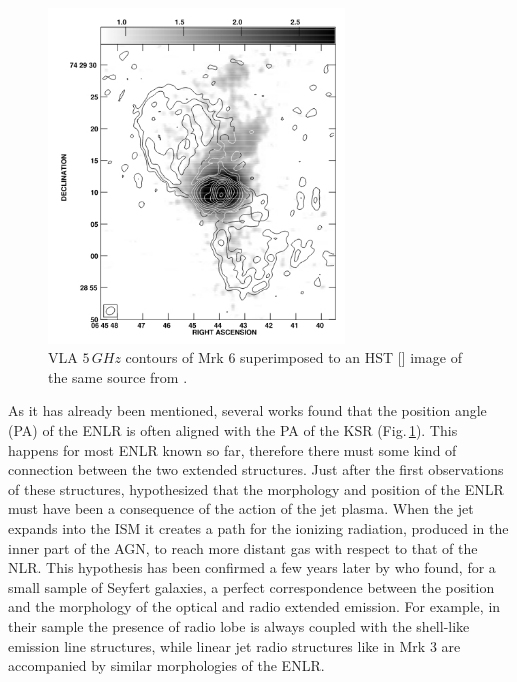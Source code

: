 \documentclass[../thesis.tex]{subfiles}
\begin{document}
\begin{figure}
\centering
\includegraphics[width=0.7\textwidth]{images/Mrk6_kharb.jpg} 
\caption[]{VLA $5\,\si{GHz}$ contours of Mrk 6 superimposed to an HST [] image of the same source from \citet{Kharb06}. }
\label{fig:mrk6_kharb}
\end{figure}

As it has already been mentioned, several works found that the position angle (PA) of the ENLR is often aligned with the PA of the KSR \citep[e.g.][]{Unger87,Wilson94,Capetti96,Falcke98,Schmitt03,Schmitt03b,Morganti07,Husemann13} (Fig.\,\ref{fig:mrk6_kharb}). 
This happens for most ENLR known so far, therefore there must some kind of connection between the two extended structures.
Just after the first observations of these structures, \citet{Wilson94} hypothesized that the morphology and position of the ENLR must have been a consequence of the action of the jet plasma.
When the jet expands into the ISM it creates a path for the ionizing radiation, produced in the inner part of the AGN, to reach more distant gas with respect to that of the NLR.
This hypothesis has been confirmed a few years later by \citet{Capetti96} who found, for a small sample of Seyfert galaxies, a perfect correspondence between the position and the morphology of the optical and radio extended emission.
For example, in their sample the presence of radio lobe is always coupled with the shell-like emission line structures, while linear jet radio structures like in Mrk 3 are accompanied by similar morphologies of the ENLR.
\end{document}
